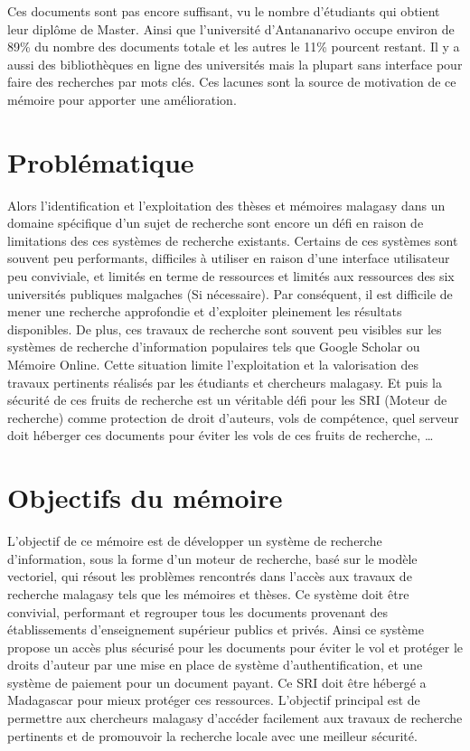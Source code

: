 Ces documents sont pas encore suffisant, vu le nombre d’étudiants qui obtient leur diplôme de Master. Ainsi que l'université d'Antananarivo occupe environ de 89\% du nombre des documents totale et les autres le 11\% pourcent restant. Il y a aussi des bibliothèques en ligne des universités mais la plupart sans interface pour faire des recherches par mots clés. Ces lacunes sont la source de motivation de ce mémoire pour apporter une amélioration.

\section{Problématique}
Alors l'identification et l'exploitation des thèses et mémoires malagasy dans un domaine spécifique d'un sujet de recherche sont encore un défi en raison de limitations des ces systèmes de recherche existants. Certains de ces systèmes sont souvent peu performants, difficiles à utiliser en raison d'une interface utilisateur peu conviviale, et limités en terme de ressources et limités aux ressources des six universités publiques malgaches (Si nécessaire). Par conséquent, il est difficile de mener une recherche approfondie et d'exploiter pleinement les résultats disponibles. De plus, ces travaux de recherche sont souvent peu visibles sur les systèmes de recherche d'information populaires tels que Google Scholar ou Mémoire Online. Cette situation limite l'exploitation et la valorisation des travaux pertinents réalisés par les étudiants et chercheurs malagasy. Et puis la sécurité de ces fruits de recherche est un véritable défi pour les SRI (Moteur de recherche) comme protection de droit d'auteurs, vols de compétence, quel serveur doit héberger ces documents pour éviter les vols de ces fruits de recherche, \dots

\section{Objectifs du mémoire}
L'objectif de ce mémoire est de développer un système de recherche d'information, sous la forme d'un moteur de recherche, basé sur le modèle vectoriel, qui résout les problèmes rencontrés dans l'accès aux travaux de recherche malagasy tels que les mémoires et thèses. Ce système doit être convivial, performant et regrouper tous les documents provenant des établissements d'enseignement supérieur publics et privés. Ainsi ce système propose un accès plus sécurisé pour les documents pour éviter le vol et protéger le droits d'auteur par une mise en place de système d'authentification, et une système de paiement pour un document payant. Ce SRI doit être hébergé a Madagascar pour mieux protéger ces ressources. L'objectif principal est de permettre aux chercheurs malagasy d'accéder facilement aux travaux de recherche pertinents et de promouvoir la recherche locale avec une meilleur sécurité.

